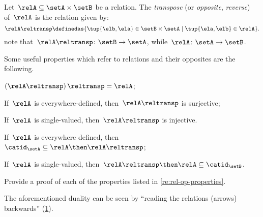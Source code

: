 \begin{definition}
  \label{def:relation-transpose}
  Let~$\relA\subseteq \setA\times \setB$ be a relation. The \emph{transpose} (or \emph{opposite}, \emph{reverse}) of~$\relA$ is the relation given by:
  \begin{equation*}
    \relA\reltransp \definedas \{\tup{\elb,\ela}\in \setB\times \setA \mid \tup{\ela,\elb}\in \relA \}.
  \end{equation*}
  note that~$\relA\reltransp\colon \setB\to \setA$, while~$\relA\colon \setA\to \setB$.
\end{definition}
\begin{remark}\label{re:rel-op-properties}
  Some useful properties which refer to relations and their opposites are the following.
  \begin{compactitem}
    \item $\left(\relA\reltransp\right)\reltransp = \relA $;
    \item If~$\relA$ is everywhere-defined, then~$\relA\reltransp$ is surjective;
    \item If~$\relA$ is single-valued, then~$\relA\reltransp$ is injective.
    \item If~$\relA$ is everywhere defined, then~$\catid_\setA\subseteq \relA\then \relA\reltransp$;
    \item If~$\relA$ is single-valued, then~$\relA\reltransp\then \relA\subseteq \catid_\setB$.
  \end{compactitem}
\end{remark}

\begin{gradedexercise}\label{ex:RelProperties}
Provide a proof of each of the properties listed in \cref{re:rel-op-properties}.
\end{gradedexercise}



\begin{remark}
  The aforementioned duality can be seen by ``reading the relations (arrows) backwards'' (\cref{fig:rel_transpose}).
\end{remark}

\begin{figure}[h!]
  \centering
  \caption{}
  \label{fig:rel_transpose}
\end{figure}
